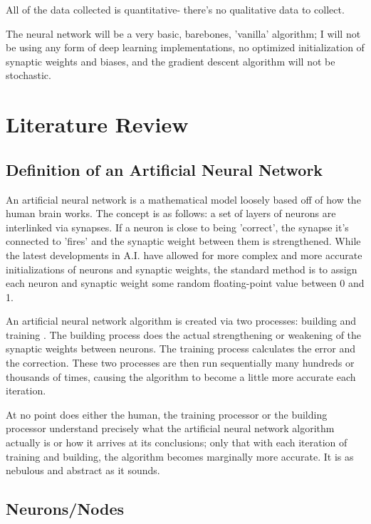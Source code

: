 \documentclass[12pt]{article}
\begin{document}
All of the data collected is quantitative- there's no qualitative data to collect.


The neural network will be a very basic, barebones, 'vanilla' algorithm; I will not be using any form of deep learning implementations, no optimized initialization of synaptic weights and biases, and the gradient descent algorithm will not be stochastic.

\section{Literature Review}

\subsection{Definition of an Artificial Neural Network \label{ANN-definition}}

An artificial neural network is a mathematical model loosely based off of how the human brain works. The concept is as follows: a set of layers of neurons are interlinked via synapses. If a neuron is close to being 'correct', the synapse it's connected to 'fires' and the synaptic weight between them is strengthened. While the latest developments in A.I. have allowed for more complex and more accurate initializations of neurons and synaptic weights, the standard method is to assign each neuron and synaptic weight some random floating-point value between 0 and 1.

An artificial neural network algorithm is created via two processes: building and training \textcite{GCPGreyAI}. The building process does the actual strengthening or weakening of the synaptic weights between neurons. The training process calculates the error and the correction. These two processes are then run sequentially many hundreds or thousands of times, causing the algorithm to become a little more accurate each iteration.

At no point does either the human, the training processor or the building processor understand precisely what the artificial neural network algorithm actually is or how it arrives at its conclusions; only that with each iteration of training and building, the algorithm becomes marginally more accurate. It is as nebulous and abstract as it sounds.

\subsection{Neurons/Nodes \label{neuron}}
\end{document}

